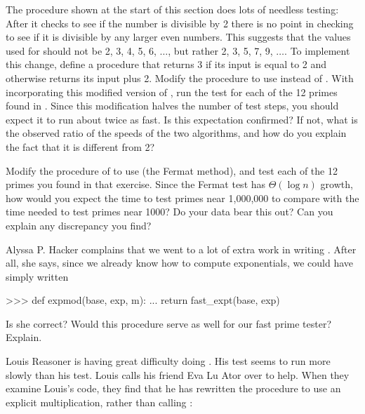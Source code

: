 \begin{exerciseGroup}
\label{Exercise 1.23}
 The 
procedure shown at the start of this section does lots of needless testing:
After it checks to see if the number is divisible by 2 there is no point in
checking to see if it is divisible by any larger even numbers.  This suggests
that the values used for  should not be 2, 3, 4, 5, 6,
\( \dots \), but rather 2, 3, 5, 7, 9, \( \dots \).  To implement this change, define a
procedure  that returns 3 if its input is equal to 2 and otherwise
returns its input plus 2.  Modify the  procedure to use
 instead of .  With
 incorporating this modified version of
, run the test for each of the 12 primes found in
.  Since this modification halves the number of test steps,
you should expect it to run about twice as fast.  Is this expectation
confirmed?  If not, what is the observed ratio of the speeds of the two
algorithms, and how do you explain the fact that it is different from 2?

\label{Exercise 1.24}
 Modify the
 procedure of  to use
 (the Fermat method), and test each of the 12 primes you
found in that exercise.  Since the Fermat test has \( \Theta(\log n) \)
growth, how would you expect the time to test primes near 1,000,000 to
compare with the time needed to test primes near 1000?  Do your data bear this
out?  Can you explain any discrepancy you find?

\label{Exercise 1.25}
 Alyssa P. Hacker complains that
we went to a lot of extra work in writing .  After all, she says,
since we already know how to compute exponentials, we could have simply written

\begin{codeBlock}
>>> def expmod(base, exp, m):
...     return fast_expt(base, exp) %
\end{codeBlock}

Is she correct?  Would this procedure serve as well for our fast prime tester?
Explain.

\label{Exercise 1.26}
 Louis Reasoner is having great
difficulty doing .  His  test seems to run
more slowly than his  test.  Louis calls his friend Eva Lu Ator
over to help.  When they examine Louis's code, they find that he has rewritten
the  procedure to use an explicit multiplication, rather than
calling :


\end{exerciseGroup}
